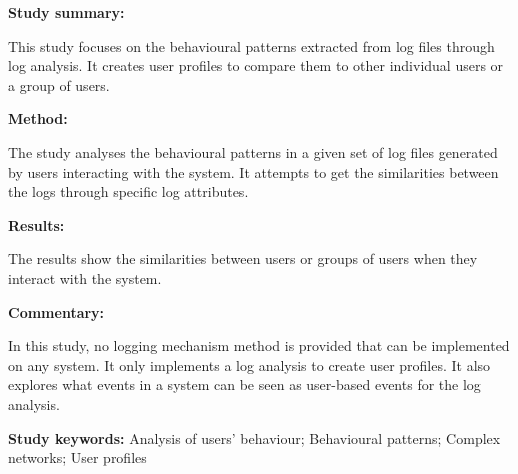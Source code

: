 \begin{tcolorbox}[colback=gray!5!white, colframe=pastelgreen!40!black, title=User behavioural patterns and reduced user profiles extracted from log files\cite{Slaninova2014}]
	\begin{minipage}[t]{0.25\textwidth}
		\textbf{Study summary:}
	\end{minipage}
	\hfill
	\begin{minipage}[t]{0.65\textwidth}
		This study focuses on the behavioural patterns extracted from log files through log
		analysis. It creates user profiles to compare them to other individual users or a group of
		users.
	\end{minipage}

	\vspace{0.75em} 

	\begin{minipage}[t]{0.25\textwidth}
		\textbf{Method:}
	\end{minipage}
	\hfill
	\begin{minipage}[t]{0.65\textwidth}
		The study analyses the behavioural patterns in a given set of log files generated by users interacting with the system. It attempts to get the similarities between the logs through specific log attributes.
	\end{minipage}

	\vspace{0.75em} 

	\begin{minipage}[t]{0.25\textwidth}
		\textbf{Results:}
	\end{minipage}
	\hfill
	\begin{minipage}[t]{0.65\textwidth}
		The results show the similarities between users or groups of users when they interact with the system.	
	\end{minipage}

	\vspace{0.75em} 

	\begin{minipage}[t]{0.25\textwidth}
		\textbf{Commentary:}
	\end{minipage}
	\hfill
	\begin{minipage}[t]{0.65\textwidth}
		In this study, no logging mechanism method is provided that can be implemented on any
		system. It only implements a log analysis to create user profiles. It also explores what
		events in a system can be seen as user-based events for the log analysis.
	\end{minipage}
	\tcblower
	\textbf{Study keywords:} Analysis of users' behaviour; Behavioural patterns; Complex networks;
	User profiles
\end{tcolorbox}

